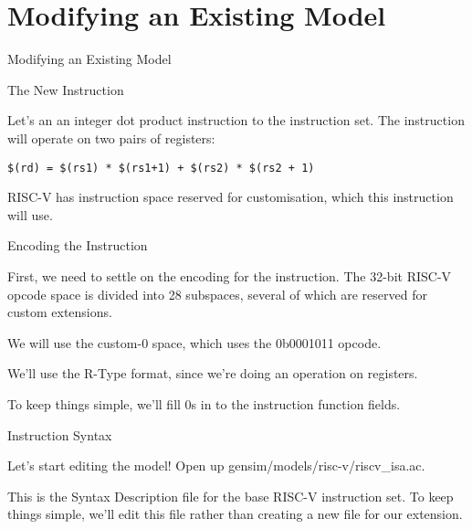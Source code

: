 \section{Modifying an Existing Model}

\begin{frame}{Modifying an Existing Model}

\end{frame}

\begin{frame}[fragile]{The New Instruction}

Let's an an integer dot product instruction to the instruction set. 
The instruction will operate on two pairs of registers:

\begin{lstlisting}
$(rd) = $(rs1) * $(rs1+1) + $(rs2) * $(rs2 + 1)
\end{lstlisting}

RISC-V has instruction space reserved for customisation, which this 
instruction will use.

\end{frame}

\begin{frame}{Encoding the Instruction}






First, we need to settle on the encoding for the instruction. The 32-bit
RISC-V opcode space is divided into 28 subspaces, several of
which are reserved for custom extensions. 

\bigskip

We will use the custom-0 space, which uses the 0b0001011 opcode.

\smallskip

We'll use the R-Type format, since we're doing an operation on registers.

\smallskip

To keep things simple, we'll fill 0s in to the instruction function
fields.

\end{frame}

\begin{frame}{Instruction Syntax}

Let's start editing the model! Open up {\ttfamily gensim/models/risc-v/riscv\_isa.ac}.

This is the Syntax Description file for the base RISC-V instruction set.
To keep things simple, we'll edit this file rather than creating a new 
file for our extension. 

\end{frame}

